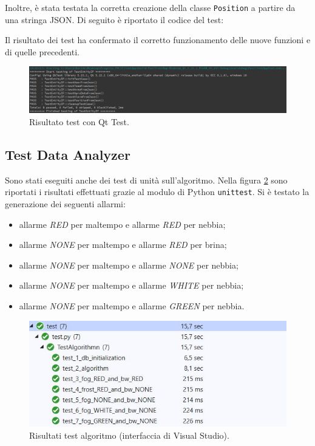 Inoltre, è stata testata la corretta creazione della classe \texttt{Position} a partire da una stringa JSON. Di seguito è riportato il codice del test: 



Il risultato dei test ha confermato il corretto funzionamento delle nuove funzioni e di quelle precedenti. 

\begin{figure}[h!]
	\centering
	\includegraphics[width=1\linewidth]{./Iterazione 3/ImageFiles/testcpp2}
	\caption{Risultato test con Qt Test.}
	\label{fig:RisultatiTestQtIT3.2}
\end{figure}

\subsection{Test Data Analyzer}
Sono stati eseguiti anche dei test di unità sull'algoritmo. Nella figura \ref{fig:test_result_alg} sono riportati i risultati effettuati grazie al modulo di Python \texttt{unittest}. Si è testato la generazione dei seguenti allarmi:
\begin{itemize}
	\item allarme \textit{RED} per maltempo e allarme \textit{RED} per nebbia;
	\item allarme \textit{NONE} per maltempo e allarme \textit{RED} per brina;
	\item allarme \textit{NONE} per maltempo e allarme \textit{NONE} per nebbia;
	\item allarme \textit{NONE} per maltempo e allarme \textit{WHITE} per nebbia;
	\item allarme \textit{NONE} per maltempo e allarme \textit{GREEN} per nebbia.
\end{itemize}

\begin{figure}[h!]
	\centering
	\includegraphics[width=1\linewidth]{./Iterazione 3/ImageFiles/TestResultAlgorithm}
	\caption{Risultati test algoritmo (interfaccia di Visual Studio).}
	\label{fig:test_result_alg}
\end{figure}

